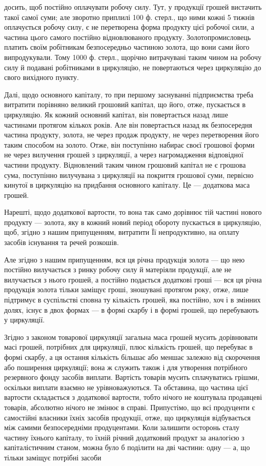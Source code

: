 досить, щоб постійно оплачувати робочу силу. Тут, у продукції грошей
вистачить такої самої суми; але зворотно приплилі 100 ф. стерл., що ними
кожні 5 тижнів оплачується робочу силу, є не перетворена форма продукту
цієї робочої сили, а частина цього самого постійно відновлюваного
продукту. Золотопромисловець платить своїм робітникам безпосередньо
частиною золота, що вони сами його випродукували. Тому 1000 ф. стерл.,
щорічно витрачувані таким чином на робочу силу й подавані робітниками
в циркуляцію, не повертаються через циркуляцію до свого вихідного
пункту.

Далі, щодо основного капіталу, то при першому заснуванні підприємства
треба витратити порівняно великий грошовий капітал, що його,
отже, пускається в циркуляцію. Як кожний основний капітал, він повертається
назад лише частинами протягом кількох років. Але він повертається
назад як безпосередня частина продукту, золота, не через продаж
продукту, не через перетворення його таким способом на золото. Отже,
він поступінно набирає своєї грошової форми не через вилучення грошей
з циркуляції, а через нагромадження відповідної частини продукту.
Відновлений таким чином грошовий капітал не є грошова сума, поступінно
вилучувана з циркуляції на покриття грошової суми, первісно кинутої
в циркуляцію на придбання основного капіталу. Це — додаткова
маса грошей.

Нарешті, щодо додаткової вартости, то вона так само дорівнює тій
частині нового продукту — золота, яку в кожний новий період обороту
пускається в циркуляцію, щоб, згідно з нашим припущенням, витратити
Її непродуктивно, на оплату засобів існування та речей розкошів.

Але згідно з нашим припущенням, вся ця річна продукція золота —
що нею постійно вилучається з ринку робочу силу й матеріяли продукції,
але не вилучається з нього грошей, а постійно подається додаткові гроші
— вся ця річна продукція золота тільки заміщує гроші, зношувані протягом
року, отже, лише підтримує в суспільстві сповна ту кількість грошей,
яка постійно, хоч і в змінних долях, існує в двох формах — в формі
скарбу і в формі грошей, що перебувають у циркуляції.

Згідно з законом товарової циркуляції загальна маса грошей мусить
дорівнювати масі грошей, потрібних для циркуляції, плюс кількість грошей,
що перебуває в формі скарбу, а ця остання кількість більшає або
меншає залежно від скорочення або поширення циркуляції; вона ж служить
також і для утворення потрібного резервного фонду засобів виплати.
Вартість товарів мусить сплачуватись грішми, оскільки виплати
взаємно не урівноважуються. Та обставина, що частина цієї вартости
складається з додаткової вартости, тобто нічого не коштувала продавцеві
товарів, абсолютно нічого не змінює в справі. Припустімо, що всі
продуценти є самостійні власники їхніх засобів продукції, отже, що циркуляція
відбувається між самими безпосередніми продуцентами. Коли залишити
осторонь сталу частину їхнього капіталу, то їхній річний додатковий
продукт за аналогією з капіталістичним станом, можна було б поділити
на дві частини: одну — а, що тільки заміщує потрібні засоби
